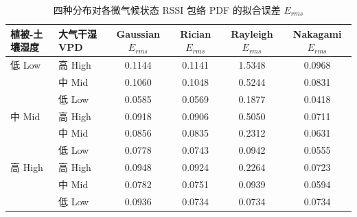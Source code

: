 \begin{table}[htbp]
\centering
\caption{四种分布对各微气候状态 RSSI 包络 PDF 的拟合误差 $E_{rms}$}
\label{tab:fading_erms}
\begin{tabular}{llcccc}
\toprule
植被-土壤湿度 & 大气干湿 VPD & Gaussian $E_{rms}$ & Rician $E_{rms}$ & Rayleigh $E_{rms}$ & Nakagami $E_{rms}$ \\
\midrule
低 Low & 高 High & 0.1144 & 0.1141 & 1.5348 & 0.0968 \\
 & 中 Mid & 0.1060 & 0.1048 & 0.5244 & 0.0831 \\
 & 低 Low & 0.0585 & 0.0569 & 0.1877 & 0.0418 \\
\midrule
中 Mid & 高 High & 0.0918 & 0.0906 & 0.5050 & 0.0711 \\
 & 中 Mid & 0.0856 & 0.0835 & 0.2312 & 0.0631 \\
 & 低 Low & 0.0778 & 0.0743 & 0.0942 & 0.0555 \\
\midrule
高 High & 高 High & 0.0948 & 0.0924 & 0.2264 & 0.0723 \\
 & 中 Mid & 0.0782 & 0.0751 & 0.0939 & 0.0594 \\
 & 低 Low & 0.0936 & 0.0734 & 0.0734 & 0.0734 \\
\bottomrule
\end{tabular}
\end{table}